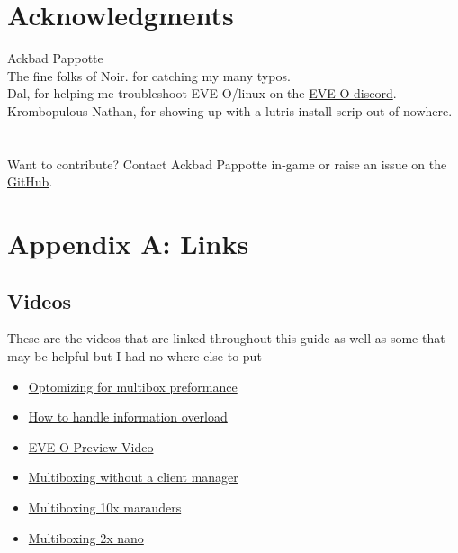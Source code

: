 \documentclass{article}
\begin{document}
\clearpage
\section{Acknowledgments}
Ackbad Pappotte \\
The fine folks of Noir. for catching my many typos.\\
Dal, for helping me troubleshoot EVE-O/linux on the \href{https://discord.gg/xYt8R9AFXB}{EVE-O discord}. \\
Krombopulous Nathan, for showing up with a lutris install scrip out of nowhere. \\
\\
\\
Want to contribute? Contact Ackbad Pappotte in-game or raise an issue on the \href{https://github.com/AckbadP/eve-multi-guide}{GitHub}.  
\\

\clearpage
\section*{Appendix A: Links}
\subsection*{Videos}
These are the videos that are linked throughout this guide as well as some that may be helpful but I had no where else to put
\begin{itemize}
  \item \href{https://www.youtube.com/watch?v=dKbQezW0ZwU}{Optomizing for multibox preformance}
  \item \href{https://www.youtube.com/watch?v=Lm4tVwSkBiE}{How to handle information overload}
  \item \href{https://www.youtube.com/watch?v=UpQpgcKSCS4}{EVE-O Preview Video}
  \item \href{https://www.youtube.com/watch?v=xpiYxq3mpD8}{Multiboxing without a client manager}
  \item \href{https://www.youtube.com/watch?v=iC8PwaFf8ck}{Multiboxing 10x marauders}
  \item \href{https://www.youtube.com/watch?v=p5WXd2IkaOc}{Multiboxing 2x nano}
\end{itemize}
\end{document}
